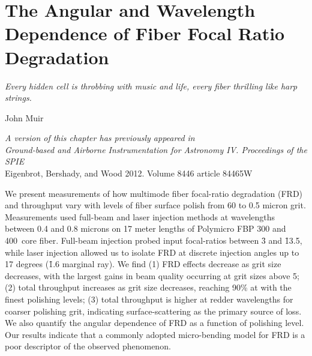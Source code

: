 \chapter[Fiber Focal Ration Degradation]{The Angular and Wavelength Dependence of Fiber Focal Ratio Degradation}
\label{chap:FRD}
\epigraph{\fixspacing\emph{Every hidden cell is throbbing with music
    and life, every fiber thrilling like harp strings.}}{John Muir}
\vfill

\begin{flushright}
  \fixspacing
  \textit{A version of this chapter has previously appeared in\\
    \emph{Ground-based and Airborne Instrumentation for Astronomy IV. Proceedings of the SPIE}}\\
    \vspace{1ex}
    Eigenbrot, Bershady, and Wood 2012. Volume 8446 article 84465W
\end{flushright}

\vspace{1in}

\cleardoublepage

\begin{chabstract}
  We present measurements of how multimode fiber focal-ratio degradation
  (FRD) and throughput vary with levels of fiber surface polish from 60
  to 0.5 micron grit. Measurements used full-beam and laser injection
  methods at wavelengths between 0.4 and 0.8 microns on 17 meter lengths
  of Polymicro FBP 300 and 400\mum\ core fiber. Full-beam injection
  probed input focal-ratios between \f3 and \f13.5, while laser
  injection allowed us to isolate FRD at discrete injection angles up to
  17 degrees (\f1.6 marginal ray). We find (1) FRD effects decrease as
  grit size decreases, with the largest gains in beam quality occurring
  at grit sizes above 5\mum; (2) total throughput increases as grit
  size decreases, reaching 90\% at \filtI with the finest polishing
  levels; (3) total throughput is higher at redder wavelengths for
  coarser polishing grit, indicating surface-scattering as the primary
  source of loss. We also quantify the angular dependence of FRD as a
  function of polishing level. Our results indicate that a commonly
  adopted micro-bending model for FRD is a poor descriptor of the
  observed phenomenon.
\end{chabstract}
\cleardoublepage

